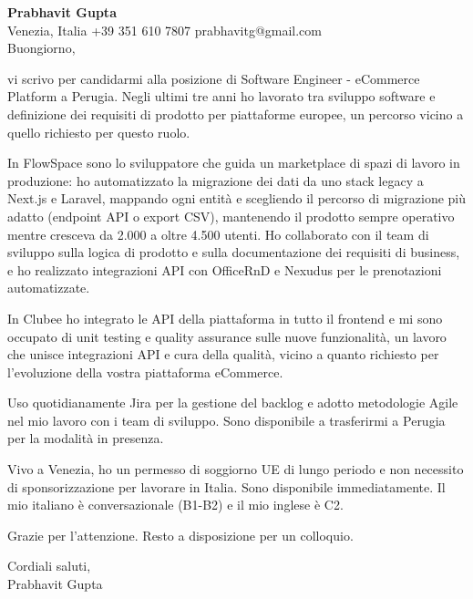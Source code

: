 \documentclass[a4paper,10.5pt]{article}
\begin{document}
\textbf{Prabhavit Gupta}\\
Venezia, Italia \textbar{} +39 351 610 7807 \textbar{} prabhavitg@gmail.com\\[10pt]
Buongiorno,

vi scrivo per candidarmi alla posizione di Software Engineer - eCommerce Platform a Perugia. Negli ultimi tre anni ho lavorato tra sviluppo software e definizione dei requisiti di prodotto per piattaforme europee, un percorso vicino a quello richiesto per questo ruolo.

In FlowSpace sono lo sviluppatore che guida un marketplace di spazi di lavoro in produzione: ho automatizzato la migrazione dei dati da uno stack legacy a Next.js e Laravel, mappando ogni entità e scegliendo il percorso di migrazione più adatto (endpoint API o export CSV), mantenendo il prodotto sempre operativo mentre cresceva da 2.000 a oltre 4.500 utenti. Ho collaborato con il team di sviluppo sulla logica di prodotto e sulla documentazione dei requisiti di business, e ho realizzato integrazioni API con OfficeRnD e Nexudus per le prenotazioni automatizzate.

In Clubee ho integrato le API della piattaforma in tutto il frontend e mi sono occupato di unit testing e quality assurance sulle nuove funzionalità, un lavoro che unisce integrazioni API e cura della qualità, vicino a quanto richiesto per l'evoluzione della vostra piattaforma eCommerce.

Uso quotidianamente Jira per la gestione del backlog e adotto metodologie Agile nel mio lavoro con i team di sviluppo. Sono disponibile a trasferirmi a Perugia per la modalità in presenza.

Vivo a Venezia, ho un permesso di soggiorno UE di lungo periodo e non necessito di sponsorizzazione per lavorare in Italia. Sono disponibile immediatamente. Il mio italiano è conversazionale (B1-B2) e il mio inglese è C2.

Grazie per l'attenzione. Resto a disposizione per un colloquio.

Cordiali saluti,\\
Prabhavit Gupta
\end{document}
